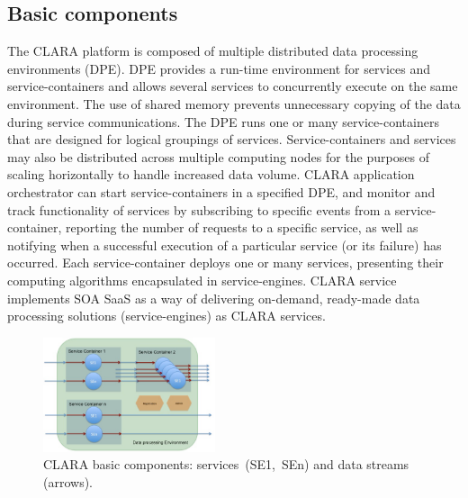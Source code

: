 \documentclass[a4paper]{jpconf}
\begin{document}
\subsection{Basic components}

The CLARA platform is composed of
multiple distributed data processing environments (DPE).
DPE provides a run-time environment for services and service-containers
and allows several services to concurrently execute on the same environment.
The use of shared memory prevents unnecessary copying of the data
during service communications.
The DPE runs one or many service-containers
that are designed for logical groupings of services.
Service-containers and services may also be distributed
across multiple computing nodes for the purposes of scaling horizontally
to handle increased data volume.
CLARA application orchestrator can start service-containers in a specified DPE,
and monitor and track functionality of services
by subscribing to specific events from a service-container,
reporting the number of requests to a specific service,
as well as notifying when a successful execution of a particular service
(or its failure) has occurred.
Each service-container deploys one or many services,
presenting their computing algorithms encapsulated in service-engines.
CLARA service implements SOA SaaS as a way of delivering on-demand,
ready-made data processing solutions (service-engines) as CLARA services.

\begin{figure}[!h]
  \begin{center}
    \includegraphics[width=0.45\textwidth]{figures/dpe}
  \end{center}
  \caption{CLARA basic components:
    services~(SE1,~SEn) and
    data streams (arrows).}
  \label{fig:dpe}
\end{figure}
\end{document}
